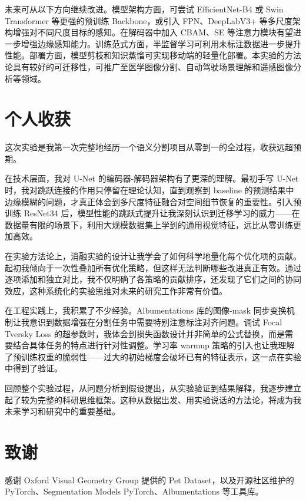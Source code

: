 未来可从以下方向继续改进。模型架构方面，可尝试 EfficientNet-B4 或 Swin Transformer 等更强的预训练 Backbone，或引入 FPN、DeepLabV3+ 等多尺度架构增强对不同尺度目标的感知。在解码器中加入 CBAM、SE 等注意力模块有望进一步增强边缘感知能力。训练范式方面，半监督学习可利用未标注数据进一步提升性能。部署方面，模型剪枝和知识蒸馏可实现移动端的轻量化部署。本实验的方法论具有较好的可迁移性，可推广至医学图像分割、自动驾驶场景理解和遥感图像分析等领域。

\section{个人收获}

这次实验是我第一次完整地经历一个语义分割项目从零到一的全过程，收获远超预期。

在技术层面，我对 U-Net 的编码器-解码器架构有了更深的理解。最初手写 U-Net 时，我对跳跃连接的作用只停留在理论认知，直到观察到 baseline 的预测结果中边缘模糊的问题，才真正体会到多尺度特征融合对空间细节恢复的重要性。引入预训练 ResNet34 后，模型性能的跳跃式提升让我深刻认识到迁移学习的威力——在数据量有限的场景下，利用大规模数据集上学到的通用视觉特征，远比从零训练更加高效。

在实验方法论上，消融实验的设计让我学会了如何科学地量化每个优化项的贡献。起初我倾向于一次性叠加所有优化策略，但这样无法判断哪些改进真正有效。通过逐项添加和独立对比，我不仅明确了各策略的贡献排序，还发现了它们之间的协同效应，这种系统化的实验思维对未来的研究工作非常有价值。

在工程实践上，我积累了不少经验。Albumentations 库的图像-mask 同步变换机制让我意识到数据增强在分割任务中需要特别注意标注对齐问题。调试 Focal Tversky Loss 的超参数时，我体会到损失函数设计并非简单的公式替换，而是需要结合具体任务的特点进行针对性调整。学习率 warmup 策略的引入也让我理解了预训练权重的脆弱性——过大的初始梯度会破坏已有的特征表示，这一点在实验中得到了验证。

回顾整个实验过程，从问题分析到假设提出，从实验验证到结果解释，我逐步建立起了较为完整的科研思维框架。这种从数据出发、用实验说话的方法论，将成为我未来学习和研究中的重要基础。

\section{致谢}

感谢 Oxford Visual Geometry Group 提供的 Pet Dataset，以及开源社区维护的 PyTorch、Segmentation Models PyTorch、Albumentations 等工具库。
